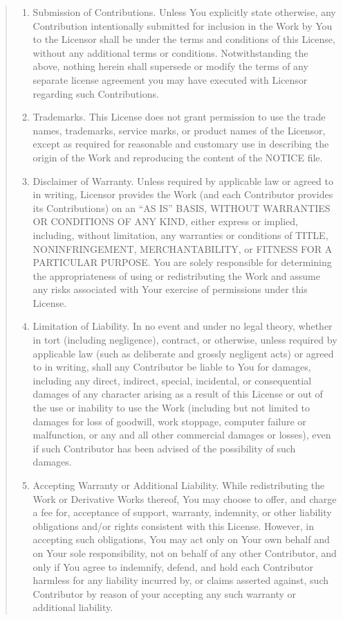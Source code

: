 \documentclass[letterpaper,10pt,english,openany,oneside]{sphinxmanual}
\begin{document}
\begin{quote}
\begin{enumerate}
\item {} 
\sphinxAtStartPar
Submission of Contributions. Unless You explicitly state otherwise,
any Contribution intentionally submitted for inclusion in the Work
by You to the Licensor shall be under the terms and conditions of
this License, without any additional terms or conditions.
Notwithstanding the above, nothing herein shall supersede or modify
the terms of any separate license agreement you may have executed
with Licensor regarding such Contributions.

\item {} 
\sphinxAtStartPar
Trademarks. This License does not grant permission to use the trade
names, trademarks, service marks, or product names of the Licensor,
except as required for reasonable and customary use in describing the
origin of the Work and reproducing the content of the NOTICE file.

\item {} 
\sphinxAtStartPar
Disclaimer of Warranty. Unless required by applicable law or
agreed to in writing, Licensor provides the Work (and each
Contributor provides its Contributions) on an “AS IS” BASIS,
WITHOUT WARRANTIES OR CONDITIONS OF ANY KIND, either express or
implied, including, without limitation, any warranties or conditions
of TITLE, NON\sphinxhyphen{}INFRINGEMENT, MERCHANTABILITY, or FITNESS FOR A
PARTICULAR PURPOSE. You are solely responsible for determining the
appropriateness of using or redistributing the Work and assume any
risks associated with Your exercise of permissions under this License.

\item {} 
\sphinxAtStartPar
Limitation of Liability. In no event and under no legal theory,
whether in tort (including negligence), contract, or otherwise,
unless required by applicable law (such as deliberate and grossly
negligent acts) or agreed to in writing, shall any Contributor be
liable to You for damages, including any direct, indirect, special,
incidental, or consequential damages of any character arising as a
result of this License or out of the use or inability to use the
Work (including but not limited to damages for loss of goodwill,
work stoppage, computer failure or malfunction, or any and all
other commercial damages or losses), even if such Contributor
has been advised of the possibility of such damages.

\item {} 
\sphinxAtStartPar
Accepting Warranty or Additional Liability. While redistributing
the Work or Derivative Works thereof, You may choose to offer,
and charge a fee for, acceptance of support, warranty, indemnity,
or other liability obligations and/or rights consistent with this
License. However, in accepting such obligations, You may act only
on Your own behalf and on Your sole responsibility, not on behalf
of any other Contributor, and only if You agree to indemnify,
defend, and hold each Contributor harmless for any liability
incurred by, or claims asserted against, such Contributor by reason
of your accepting any such warranty or additional liability.


\end{enumerate}
\end{quote}
\end{document}
